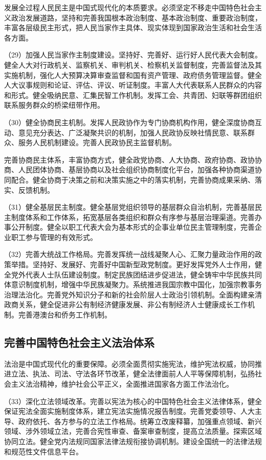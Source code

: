     发展全过程人民民主是中国式现代化的本质要求。必须坚定不移走中国特色社会主义政治发展道路，坚持和完善我国根本政治制度、基本政治制度、重要政治制度，丰富各层级民主形式，把人民当家作主具体、现实体现到国家政治生活和社会生活各方面。

    （29）加强人民当家作主制度建设。坚持好、完善好、运行好人民代表大会制度。健全人大对行政机关、监察机关、审判机关、检察机关监督制度，完善监督法及其实施机制，强化人大预算决算审查监督和国有资产管理、政府债务管理监督。健全人大议事规则和论证、评估、评议、听证制度。丰富人大代表联系人民群众的内容和形式。健全吸纳民意、汇集民智工作机制。发挥工会、共青团、妇联等群团组织联系服务群众的桥梁纽带作用。

    （30）健全协商民主机制。发挥人民政协作为专门协商机构作用，健全深度协商互动、意见充分表达、广泛凝聚共识的机制，加强人民政协反映社情民意、联系群众、服务人民机制建设。完善人民政协民主监督机制。

    完善协商民主体系，丰富协商方式，健全政党协商、人大协商、政府协商、政协协商、人民团体协商、基层协商以及社会组织协商制度化平台，加强各种协商渠道协同配合。健全协商于决策之前和决策实施之中的落实机制，完善协商成果采纳、落实、反馈机制。

    （31）健全基层民主制度。健全基层党组织领导的基层群众自治机制，完善基层民主制度体系和工作体系，拓宽基层各类组织和群众有序参与基层治理渠道。完善办事公开制度。健全以职工代表大会为基本形式的企事业单位民主管理制度，完善企业职工参与管理的有效形式。

    （32）完善大统战工作格局。完善发挥统一战线凝聚人心、汇聚力量政治作用的政策举措。坚持好、发展好、完善好中国新型政党制度。更好发挥党外人士作用，健全党外代表人士队伍建设制度。制定民族团结进步促进法，健全铸牢中华民族共同体意识制度机制，增强中华民族凝聚力。系统推进我国宗教中国化，加强宗教事务治理法治化。完善党外知识分子和新的社会阶层人士政治引领机制。全面构建亲清政商关系，健全促进非公有制经济健康发展、非公有制经济人士健康成长工作机制。完善港澳台和侨务工作机制。

    \subsection{完善中国特色社会主义法治体系}

    法治是中国式现代化的重要保障。必须全面贯彻实施宪法，维护宪法权威，协同推进立法、执法、司法、守法各环节改革，健全法律面前人人平等保障机制，弘扬社会主义法治精神，维护社会公平正义，全面推进国家各方面工作法治化。

    （33）深化立法领域改革。完善以宪法为核心的中国特色社会主义法律体系，健全保证宪法全面实施制度体系，建立宪法实施情况报告制度。完善党委领导、人大主导、政府依托、各方参与的立法工作格局。统筹立改废释纂，加强重点领域、新兴领域、涉外领域立法，完善合宪性审查、备案审查制度，提高立法质量。探索区域协同立法。健全党内法规同国家法律法规衔接协调机制。建设全国统一的法律法规和规范性文件信息平台。


